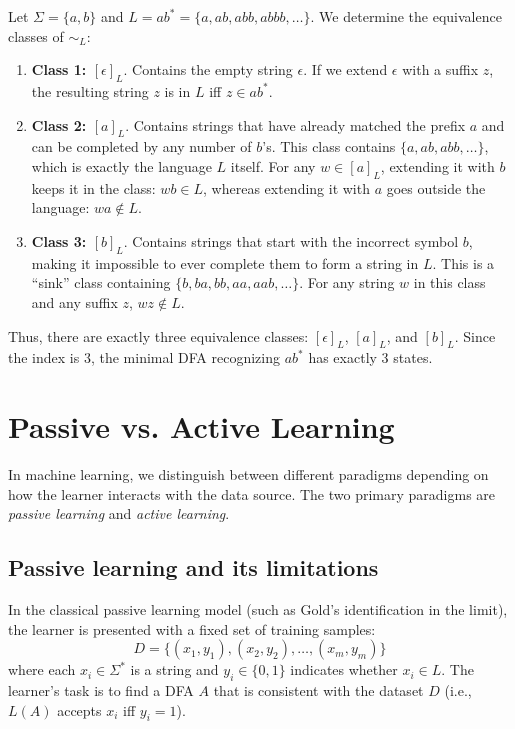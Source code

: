 \begin{example}[A regular language: $L = ab^*$]
Let $\Sigma = \{a, b\}$ and $L = ab^* = \{a, ab, abb, abbb, \dots\}$. We determine the equivalence classes of $\sim_L$:
\begin{enumerate}
  \item \textbf{Class 1: $[\epsilon]_L$}. Contains the empty string $\epsilon$. If we extend $\epsilon$ with a suffix $z$, the resulting string $z$ is in $L$ iff $z \in ab^*$.
  \item \textbf{Class 2: $[a]_L$}. Contains strings that have already matched the prefix $a$ and can be completed by any number of $b$'s. This class contains $\{a, ab, abb, \dots\}$, which is exactly the language $L$ itself. For any $w \in [a]_L$, extending it with $b$ keeps it in the class: $wb \in L$, whereas extending it with $a$ goes outside the language: $wa \notin L$.
  \item \textbf{Class 3: $[b]_L$}. Contains strings that start with the incorrect symbol $b$, making it impossible to ever complete them to form a string in $L$. This is a ``sink'' class containing $\{b, ba, bb, aa, aab, \dots\}$. For any string $w$ in this class and any suffix $z$, $wz \notin L$.
\end{enumerate}
Thus, there are exactly three equivalence classes: $[\epsilon]_L$, $[a]_L$, and $[b]_L$. Since the index is $3$, the minimal DFA recognizing $ab^*$ has exactly $3$ states.
\end{example}

\section{Passive vs. Active Learning}
\label{sec:active-learning}

In machine learning, we distinguish between different paradigms depending on how the learner interacts with the data source. The two primary paradigms are \emph{passive learning} and \emph{active learning}.

\subsection{Passive learning and its limitations}

In the classical passive learning model (such as Gold's identification in the limit), the learner is presented with a fixed set of training samples:
\[
  D = \{(x_1, y_1), (x_2, y_2), \dots, (x_m, y_m)\}
\]
where each $x_i \in \Sigma^*$ is a string and $y_i \in \{0, 1\}$ indicates whether $x_i \in L$. The learner's task is to find a DFA $A$ that is consistent with the dataset $D$ (i.e., $L(A)$ accepts $x_i$ iff $y_i = 1$).

